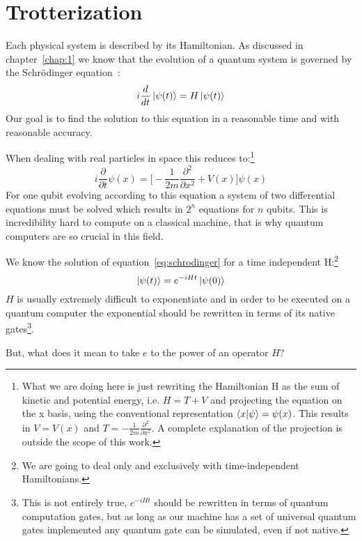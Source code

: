 \section{Trotterization}\label{sec:trotterization}
Each physical system is described by its Hamiltonian.
As discussed in chapter~\ref{chap:1} we know that the evolution of a quantum system is governed by the Schrödinger equation~\cite{Shankar}:
\begin{equation}\label{eq:schrodinger}
i \frac{d}{dt}  \ket{\psi(t)} = H \ket{\psi(t)}
\end{equation}
Our goal is to find the solution to this equation in a reasonable time and with reasonable accuracy.

When dealing with real particles in space this reduces to:\footnote{What we are doing here is just rewriting the Hamiltonian H as the sum of kinetic and potential energy, i.e. $H = T + V$ and projecting the equation on the x basis, using the conventional representation $\braket{x|\psi} = \psi(x)$. This results in $V = V(x)$ and $T = - \frac{1}{2m}\frac{\partial^2}{\partial x^2}$. A complete explanation of the projection is outside the scope of this work.}
\begin{equation}
i \frac{\partial}{\partial t} \psi(x) = \biggl[ - \frac{1}{2m}\frac{\partial^2}{\partial x^2} + V(x) \biggr]\psi(x)
\end{equation}
For one qubit evolving according to this equation a system of two differential equations must be solved which results in $2^n$ equations for $n$ qubits. This is incredibility hard to compute on a classical machine, that is why quantum computers are so crucial in this field.

We know the solution of equation~\ref{eq:schrodinger} for a time independent H:\footnote{We are going to deal only and exclusively with time-independent Hamiltonians.}
\begin{equation}
\ket{\psi(t)} = e^{-iHt} \ket{\psi(0)}
\end{equation}
$H$ is usually extremely difficult to exponentiate and in order to be executed on a quantum computer the exponential should be rewritten in terms of its native gates\footnote{This is not entirely true, $e^{-iHt}$ should be rewritten in terms of quantum computation gates, but as long as our machine has a set of universal quantum gates implemented any quantum gate can be simulated, even if not native.}.

But, what does it mean to take $e$ to the power of an operator $H$? 

